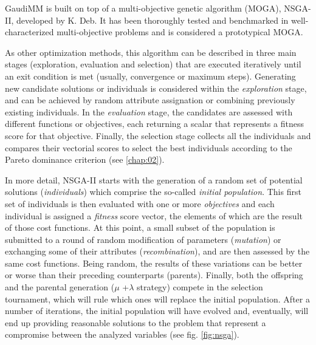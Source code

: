 GaudiMM is built on top of a multi-objective genetic algorithm (MOGA), NSGA-II, developed by K. Deb.\cite{nsgaii} It has been thoroughly tested and benchmarked in well-characterized multi-objective problems and is considered a prototypical MOGA.

As other optimization methods, this algorithm can be described in three main stages (exploration, evaluation and selection) that are executed iteratively until an exit condition is met (usually, convergence or maximum steps). Generating new candidate solutions or individuals is considered within the \textit{exploration} stage, and can be achieved by random attribute assignation or combining previously existing individuals. In the \textit{evaluation} stage, the candidates are assessed with different functions or objectives, each returning a scalar that represents a fitness score for that objective. Finally, the selection stage collects all the individuals and compares their vectorial scores to select the best individuals according to the Pareto dominance criterion (see \autoref{chap:02}).

In more detail, NSGA-II starts with the generation of a random set of potential solutions (\textit{individuals}) which comprise the so-called \textit{initial population}. This first set of individuals is then evaluated with one or more \textit{objectives} and each individual is assigned a \textit{fitness} score vector, the elements of which are the result of those cost functions. At this point, a small subset of the population is submitted to a round of random modification of parameters (\textit{mutation}) or exchanging some of their attributes (\textit{recombination}), and are then assessed by the same cost functions. Being random, the results of these variations can be better or worse than their preceding counterparts (parents). Finally, both the offspring and the parental generation ($ \mu $ +$ \lambda $ strategy) compete in the selection tournament, which will rule which ones will replace the initial population. After a number of iterations, the initial population will have evolved and, eventually, will end up providing reasonable solutions to the problem that represent a compromise between the analyzed variables (see fig. \ref{fig:nsga}).


